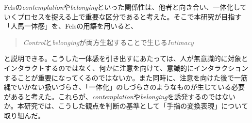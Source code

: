 
Felsの\textit{contemplation}や\textit{belonging}といった関係性は、他者と向き合い、一体化していくプロセスを捉える上で重要な区分であると考えた。そこで本研究が目指す「人馬一体感」を、Felsの用語を用いると、
\begin{quote}
\textit{Control}と\textit{belonging}が両方生起することで生じる\textit{Intimacy}  
\end{quote}
と説明できる。こうした一体感を引き出すにあたっては、人が無意識的に対象とインタラクトするのではなく、何かに注意を向けて、意識的にインタラクションすることが重要になってくるのではないか。また同時に、注意を向けた後で一筋縄でいかない扱いづらさ、「一体化」のしづらさのようなものが生じている必要があると考えた。これらが、\textit{contemplation}や\textit{belonging}を誘発するのではないか。本研究では、こうした観点を判断の基準として「手指の変換表現」について取り組んだ。





